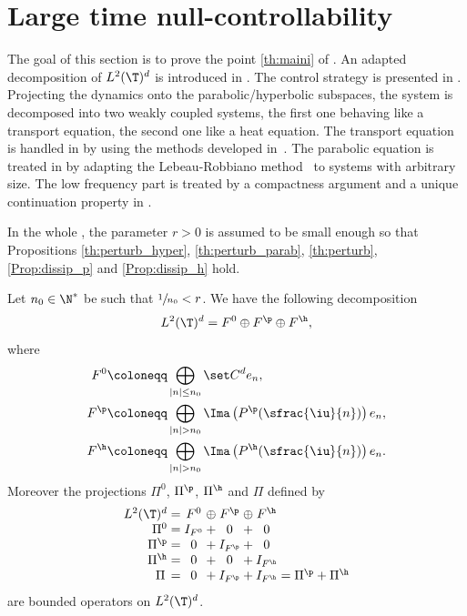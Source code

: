 \section{Large time null-controllability} \label{sec:NC}

The goal of this section is to prove the point \eqref{th:maini} of . An adapted decom\-position of $L^2(\T)^d$ is introduced in . The control strategy is presented in .
Projecting the dynamics onto the parabolic/hyperbolic subspaces, the system is decomposed into two weakly coupled systems, the first one behaving like a transport equation, the second one like a heat equation. The transport equation is handled in  by using the methods developed in~\cite{alabau-boussouira_2017}. The parabolic equation is treated in  by adapting the Lebeau-Robbiano method~\cite{lebeau_1995} to systems with arbitrary size. The low frequency part is treated by a compactness argument and a unique continuation property in .

In the whole , the parameter $r>0$ is assumed to be small enough so that Propositions \ref{th:perturb_hyper}, \ref{th:perturb_parab}, \ref{th:perturb}, \ref{Prop:dissip_p} and \ref{Prop:dissip_h} hold.

 \label{subsec:decomp}

\begin{prop}
\label{decompL2}
Let $n_0 \in \N^*$ be such that $\sfrac{1}{n_0} < r$. We have the following decomposition
\begin{equation}
\label{DecompRd}
L^2(\T)^{d} = F^0 \oplus F^\p \oplus F^\h,
\end{equation}
where
\begin{align}
\label{defW0}
F^0 &\coloneqq \bigoplus\limits_{|n| \leq n_0} \set C^d e_n,\\
\label{defWp}
F^\p &\coloneqq\bigoplus\limits_{|n| > n_0} \Ima\left(P^\p(\sfrac{\iu}{n})\right) e_n,\\
\label{defWh}
F^\h &\coloneqq\bigoplus\limits_{|n| > n_0} \Ima\left(P^\h(\sfrac{\iu}{n})\right) e_n.
\end{align}
Moreover the projections $\Pi^{0}$, $\Pi^{\p}$, $\Pi^{\h}$ and $\Pi$ defined by
\[
\begin{array}{r@{}c@{}c@{}c@{}c@{}c@{}c@{}c}
L^2(\T)^{d} &{}={}& F^0 & {}\oplus{} & F^\p & {}\oplus{} & F^\h & \\
\Pi^0 &{}={}& I_{F^0} & {}+{} & 0 & {}+{} & 0 & \\
\Pi^\p &{}={}& 0 & {}+{} & I_{F^\p} & {}+{} & 0 & \\
\Pi^\h &{}={}& 0 & {}+{} & 0 & {}+{} & I_{F^\h} & \\
\Pi\, &{}={}& 0 & {}+{} & I_{F^\p} & {}+{} & I_{F^\h} & {}= \Pi^\p+\Pi^\h \end{array}
\]
are bounded operators on $L^2(\T)^d$.
\end{prop}


